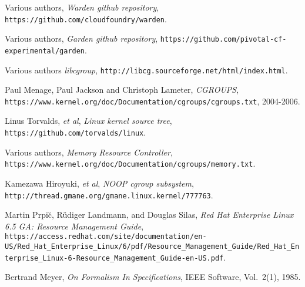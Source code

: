 \documentclass[a4paper,twoside,12pt]{article}
\begin{document}
\begin{flushleft}
\begin{thebibliography}{99}   


  Various authors,
  \emph{Warden github repository},
  \texttt{https://github.com/cloudfoundry/warden}.

  Various authors,
  \emph{Garden github repository}, 
  \texttt{https://github.com/pivotal-cf-experimental/garden}.

  Various authors
  \emph{libcgroup},
  {\small \texttt{http://libcg.sourceforge.net/html/index.html}}.

  Paul Menage, Paul Jackson and Christoph Lameter,
  \emph{CGROUPS},
  {\small \texttt{https://www.kernel.org/doc/Documentation/cgroups/cgroups.txt}}, 2004-2006.

  Linus Torvalds, \emph{et al},
  \emph{Linux kernel source tree},
  {\small \texttt{https://github.com/torvalds/linux}}.

  Various authors,
  \emph{Memory Resource Controller},
  {\small \texttt{https://www.kernel.org/doc/Documentation/cgroups/memory.txt}}.

  Kamezawa Hiroyuki, \emph{et al},
  \emph{NOOP cgroup subsystem},
  {\small \texttt{http://thread.gmane.org/gmane.linux.kernel/777763}}.

  Martin Prpi\u{c}, R\"udiger Landmann, and Douglas Silas,
  \emph{Red Hat Enterprise Linux 6.5 GA: Resource Management Guide}, 
  {\small \texttt{https://access.redhat.com/site/documentation/en-US\slash{}Red\_Hat\_Enterprise\_Linux/6/pdf/Resource\_Management\_Guide\slash{}Red\_Hat\_Enterprise\_Linux-6-Resource\_Management\_Guide-en-US.pdf}}.

  Bertrand Meyer,
  \emph{On Formalism In Specifications},
  IEEE Software, Vol.~2(1), 1985.
\end{thebibliography}
\end{flushleft}
\end{document}
